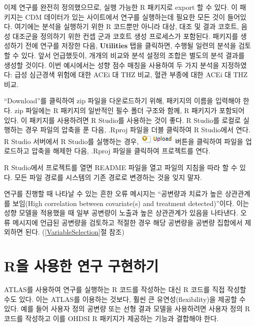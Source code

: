 \documentclass[11pt]{book}
\theoremstyle{definition}
\theoremstyle{definition}
\theoremstyle{definition}
\theoremstyle{remark}
\begin{document}
이제 연구를 완전히 정의했으므로, 실행 가능한 R 패키지로 export 할 수
있다. 이 패키지는 CDM 데이터가 있는 사이트에서 연구를 실행하는데 필요한
모든 것이 들어있다. 여기에는 분석을 실행하기 위한 R 코드뿐만 아니라
대상, 대조 및 결과 코호트, 음성 대조군을 정의하기 위한 컨셉 군과 코호트
생성 프로세스가 포함된다. 패키지를 생성하기 전에 연구를 저장한 다음,
\textbf{Utilities} 탭을 클릭하면, 수행될 일련의 분석을 검토할 수 있다.
앞서 언급했듯이, 개개의 비교와 분석 설정의 조합은 별도의 분석 결과를
생성할 것이다. 이번 예시에서는 성향 점수 매칭을 사용하여 두 가지 분석을
지정하였다: 급성 심근경색 위험에 대한 ACEi 대 THZ 비교, 혈관 부종에 대한
ACEi 대 THZ 비교.

``Download''를 클릭하여 zip 파일을 다운로드하기 위해, 패키지의 이름을
입력해야 한다. zip 파일에는 R 패키지의 일반적인 필수 폴더 구조와 함께, R
패키지가 포함되어 있다. \citep{Wickham_2015} 이 패키지를 사용하려면 R
Studio를 사용하는 것이 좋다. R Studio를 로컬로 실행하는 경우 파일의
압축을 푼 다음, .Rproj 파일을 더블 클릭하여 R Studio에서 연다. R Studio
서버에서 R Studio를 실행하는 경우,
\includegraphics{images/PopulationLevelEstimation/upload.png} 버튼을
클릭하여 파일을 업로드하고 압축을 해제한 다음, .Rproj 파일을 클릭하여
프로젝트를 연다.

R Studio에서 프로젝트를 열면 README 파일을 열고 파일의 지침을 따라 할 수
있다. 모든 파일 경로를 시스템의 기존 경로로 변경하는 것을 잊지 말자.

연구를 진행할 때 나타날 수 있는 흔한 오류 메시지는 ``공변량과 치료가
높은 상관관계를 보임(High correlation between covariate(s) and treatment
detected)''이다. 이는 성향 모델을 적용했을 때 일부 공변량이 노출과 높은
상관관계가 있음을 나타낸다. 오류 메시지에 언급된 공변량을 검토하고
적절한 경우 해당 공변량을 공변량 집합에서 제외하면 된다.
(\ref{VariableSelection}절 참조) 

\section{R을 사용한 연구 구현하기}\label{pleR}

ATLAS를 사용하여 연구를 실행하는 R 코드를 작성하는 대신 R 코드를 직접
작성할 수도 있다. 이는 ATLAS를 이용하는 것보다, 훨씬 큰
유연성(flexibility)을 제공할 수 있다. 예를 들어 사용자 정의 공변량 또는
선형 결과 모델을 사용하려면 사용자 정의 R 코드를 작성하고 이를 OHDSI R
패키지가 제공하는 기능과 결합해야 한다.
\end{document}
